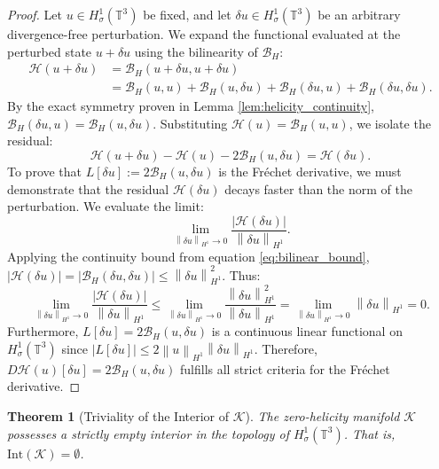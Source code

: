 \documentclass[12pt,a4paper]{article}
\theoremstyle{plain}
\newtheorem{theorem}{Theorem}[section]
\theoremstyle{definition}
\theoremstyle{remark}
\newcommand{\T}{\mathbb{T}}
\newcommand{\norm}[1]{\left\|#1\right\|}
\begin{document}
\begin{proof}
Let $u \in H^1_\sigma(\T^3)$ be fixed, and let $\delta u \in H^1_\sigma(\T^3)$ be an arbitrary divergence-free perturbation. We expand the functional evaluated at the perturbed state $u + \delta u$ using the bilinearity of $\mathcal{B}_H$:
\begin{align*}
  \mathcal{H}(u + \delta u) 
  &= \mathcal{B}_H(u + \delta u, u + \delta u) \\
  &= \mathcal{B}_H(u, u) + \mathcal{B}_H(u, \delta u) + \mathcal{B}_H(\delta u, u) + \mathcal{B}_H(\delta u, \delta u).
\end{align*}
By the exact symmetry proven in Lemma \ref{lem:helicity_continuity}, $\mathcal{B}_H(\delta u, u) = \mathcal{B}_H(u, \delta u)$. Substituting $\mathcal{H}(u) = \mathcal{B}_H(u,u)$, we isolate the residual:
\[
  \mathcal{H}(u + \delta u) - \mathcal{H}(u) - 2\mathcal{B}_H(u, \delta u) = \mathcal{H}(\delta u).
\]
To prove that $L[\delta u] := 2\mathcal{B}_H(u, \delta u)$ is the Fréchet derivative, we must demonstrate that the residual $\mathcal{H}(\delta u)$ decays faster than the norm of the perturbation. We evaluate the limit:
\[
  \lim_{\norm{\delta u}_{H^1} \to 0} \frac{|\mathcal{H}(\delta u)|}{\norm{\delta u}_{H^1}}.
\]
Applying the continuity bound from equation \eqref{eq:bilinear_bound}, $|\mathcal{H}(\delta u)| = |\mathcal{B}_H(\delta u, \delta u)| \le \norm{\delta u}_{H^1}^2$. Thus:
\[
  \lim_{\norm{\delta u}_{H^1} \to 0} \frac{|\mathcal{H}(\delta u)|}{\norm{\delta u}_{H^1}} \le \lim_{\norm{\delta u}_{H^1} \to 0} \frac{\norm{\delta u}_{H^1}^2}{\norm{\delta u}_{H^1}} = \lim_{\norm{\delta u}_{H^1} \to 0} \norm{\delta u}_{H^1} = 0.
\]
Furthermore, $L[\delta u] = 2\mathcal{B}_H(u, \delta u)$ is a continuous linear functional on $H^1_\sigma(\T^3)$ since $|L[\delta u]| \le 2\norm{u}_{H^1} \norm{\delta u}_{H^1}$. Therefore, $D\mathcal{H}(u)[\delta u] = 2\mathcal{B}_H(u, \delta u)$ fulfills all strict criteria for the Fréchet derivative.
\end{proof}

\begin{theorem}[Triviality of the Interior of $\mathcal{K}$]
\label{thm:empty_interior}
The zero-helicity manifold $\mathcal{K}$ possesses a strictly empty interior in the topology of $H^1_\sigma(\T^3)$. That is, $\mathrm{Int}(\mathcal{K}) = \emptyset$.
\end{theorem}
\end{document}
